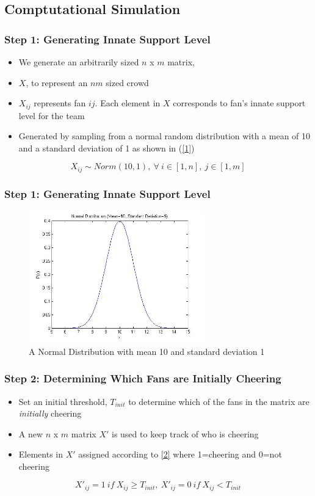 \documentclass[compress,handout,10pt]{beamer}
\let\olditem\item
\renewcommand{\item}{\setlength{\itemsep}{0.5\baselineskip}\olditem}
\begin{document}
\subsection{Comptutational Simulation}

\begin{frame}
\frametitle{Step 1: Generating Innate Support Level}
\begin{itemize}
\item We generate an arbitrarily sized $n$ x $m$ matrix,
\item  $X$, to represent an $nm$ sized crowd
\item   $X_{ij}$ represents fan $ij$. Each element in $X$ corresponds to fan's innate support level for the team
\item 	Generated by sampling from a normal random distribution with a mean of 10 and a standard deviation of 1 as shown in (\ref{1})
\end{itemize} 
\begin{equation}
X_{ij}\sim Norm(10,1),~\forall~i\in[1,n],~j\in[1,m]
\label{1}
\end{equation}
\end{frame}

\begin{frame}
	\frametitle{Step 1: Generating Innate Support Level}
	\begin{figure}
		\begin{center}
		\includegraphics[width=3in] {NormDistribution.jpg}
		\end{center}
		\caption{A Normal Distribution with mean 10 and standard deviation 1}
		\label{fig:normdistribution}
	\end{figure}
\end{frame}

\begin{frame}
\frametitle{Step 2: Determining Which Fans are Initially Cheering}
\begin{itemize}
\item Set an initial threshold, $T_{init}$ to determine which of the fans in the matrix are \textit{initially} cheering
\item A new $n$ x $m$ matrix $X'$ is used to keep track of who is cheering 
\item Elements in $X'$ assigned according to \eqref{2} where 1=cheering and 0=not cheering
\end{itemize}
\begin{equation}
X'_{ij}=1~if~X_{ij}\geq T_{init},~X'_{ij}=0~if~X_{ij}<T_{init}
\label{2}
\end{equation}
\end{frame}
\end{document}
